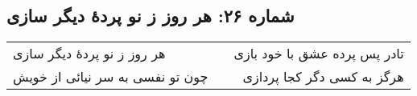 \begin{center}
\section*{شماره ۲۶: هر روز ز نو پردۀ دیگر سازی}
\label{sec:026}
\begin{longtable}{l p{0.5cm} r}
هر روز ز نو پردهٔ دیگر سازی
&&
تادر پس پرده عشق با خود بازی
\\
چون تو نفسی به سر نیائی از خویش
&&
هرگز به کسی دگر کجا پردازی
\\
\end{longtable}
\end{center}
